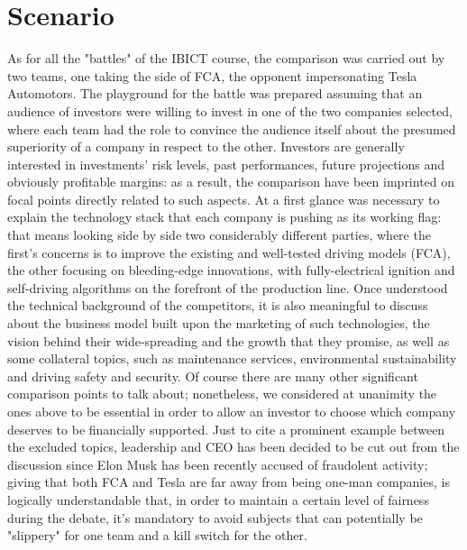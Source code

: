 \section{Scenario}

As for all the "battles" of the IBICT course, the comparison was carried out by two teams, one taking the side of FCA, the opponent impersonating Tesla Automotors.
The playground for the battle was prepared assuming that an audience of investors were willing to invest in one of the two companies selected, where each team had the role to convince the audience itself about the presumed superiority of a company in respect to the other.
Investors are generally interested in investments' risk levels, past performances, future projections and obviously profitable margins: as a result, the comparison have been imprinted on focal points directly related to such aspects. At a first glance was necessary to explain the technology stack that each company is pushing as its working flag: that means looking side by side two considerably different parties, where the first's concerns is to improve the existing and well-tested driving models (FCA), the other focusing on bleeding-edge innovations, with fully-electrical ignition and self-driving algorithms on the forefront of the production line. Once understood the technical background of the competitors, it is also meaningful to discuss about the business model built upon the marketing of such technologies, the vision behind their wide-spreading and the growth that they promise, as well as some collateral topics, such as maintenance services, environmental sustainability and driving safety and security.
Of course there are many other significant comparison points to talk about; nonetheless, we considered at unanimity the ones above to be essential in order to allow an investor to choose which company deserves to be financially supported. Just to cite a prominent example between the excluded topics, leadership and CEO has been decided to be cut out from the discussion since Elon Musk has been recently accused of fraudolent activity; giving that both FCA and Tesla are far away from being one-man companies, is logically understandable that, in order to maintain a certain level of fairness during the debate, it's mandatory to avoid subjects that can potentially be "slippery" for one team and a kill switch for the other.


